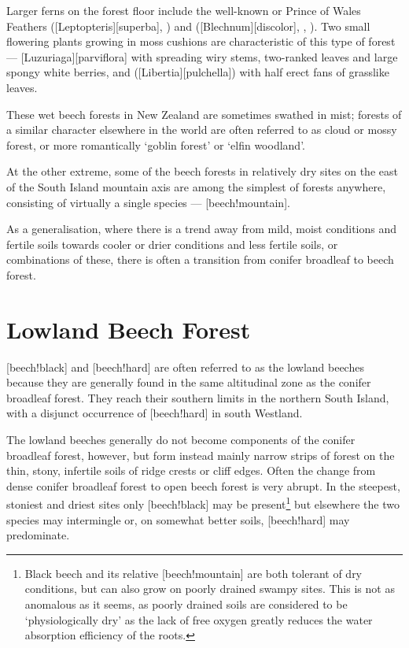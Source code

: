 Larger ferns on the forest floor include the well-known  or Prince of Wales Feathers ([Leptopteris][superba], ) and  ([Blechnum][discolor], , ).
Two small flowering plants growing in moss cushions are characteristic of this type of forest --- [Luzuriaga][parviflora] with spreading wiry stems, two-ranked leaves and large spongy white berries, and  ([Libertia][pulchella]) with half erect fans of grasslike leaves.

These wet beech forests in New Zealand are sometimes swathed in mist; forests of a similar character elsewhere in the world are often referred to as cloud or mossy forest, or more romantically `goblin forest' or `elfin woodland'.

At the other extreme, some of the beech forests in relatively dry sites on the east of the South Island mountain axis are among the simplest of forests anywhere, consisting of virtually a single species --- [beech!mountain].

As a generalisation, where there is a trend away from mild, moist conditions and fertile soils towards cooler or drier conditions and less fertile soils, or combinations of these, there is often a transition from conifer broadleaf to beech forest.

\section{Lowland Beech Forest}

[beech!black] and [beech!hard] are often referred to as the lowland beeches because they are generally found in the same altitudinal zone as the conifer broadleaf forest.
They reach their southern limits in the northern South Island, with a disjunct occurrence of [beech!hard] in south Westland.

The lowland beeches generally do not become components of the conifer broadleaf forest, however, but form instead mainly narrow strips of forest on the thin, stony, infertile soils of ridge crests or cliff edges.
Often the change from dense conifer broadleaf forest to open beech forest is very abrupt.
In the steepest, stoniest and driest sites only [beech!black] may be present\footnote{Black beech and its relative [beech!mountain] are both tolerant of dry conditions, but can also grow on poorly drained swampy sites. This is not as anomalous as it seems, as poorly drained soils are considered to be `physiologically dry' as the lack of free oxygen greatly reduces the water absorption efficiency of the roots.} but elsewhere the two species may intermingle or, on somewhat better soils, [beech!hard] may predominate.

